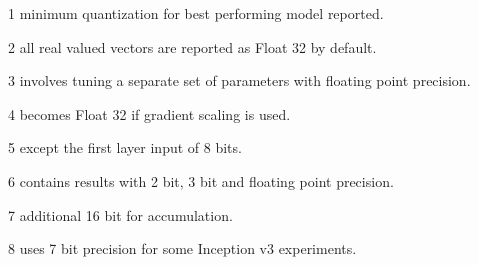 \documentclass{article}%
\begin{document}
\begin{table}
\begin{threeparttable}[tb]
\begin{scriptsize}
\begin{tablenotes}
 \item[1] minimum quantization for best performing model reported.
 \item[2] all real valued vectors are reported as Float 32 by default.
 \item[3] involves tuning a separate set of parameters with floating point precision.
 \item[4] becomes Float 32 if gradient scaling is used.
 \item[5] except the first layer input of 8 bits.
 \item[6] contains results with 2 bit, 3 bit and floating point precision.
 \item[7] additional 16 bit for accumulation.
 \item[8] uses 7 bit precision for some Inception v3 experiments.
\end{tablenotes}
\end{scriptsize}
\end{threeparttable}
\end{table}%
\end{document}

